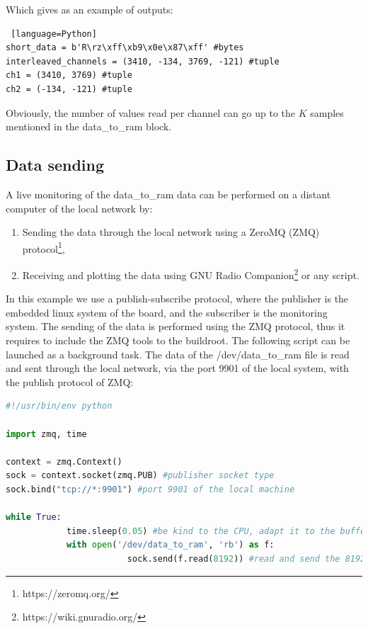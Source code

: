 \documentclass[12pt,oneside]{article}
\begin{document}
Which gives as an example of outputs:


\begin{lstlisting} [language=Python]
short_data = b'R\rz\xff\xb9\x0e\x87\xff' #bytes
interleaved_channels = (3410, -134, 3769, -121) #tuple
ch1 = (3410, 3769) #tuple
ch2 = (-134, -121) #tuple
\end{lstlisting}
\vspace{0.6cm}

Obviously, the number of values read per channel can go up to the $K$ samples mentioned in the data\_to\_ram block. 

\subsection{Data sending}\label{sect:dataSending}

A live monitoring of the data\_to\_ram data can be performed on a distant computer of the local network by:
\begin{enumerate}
	\setlength\itemsep{-0.1cm}
	\item Sending the data through the local network using a ZeroMQ (ZMQ) protocol\footnote{https://zeromq.org/},
	\item Receiving and plotting the data using GNU Radio Companion\footnote{https://wiki.gnuradio.org/} or any script.
\end{enumerate}

In this example we use a publish-subscribe protocol, where the publisher is the embedded linux system of the board, and the subscriber is the monitoring system. The sending of the data is performed using the ZMQ protocol, thus it requires to include the ZMQ tools to the buildroot. The following script can be launched as a background task. The data of the /dev/data\_to\_ram file is read and sent through the local network, via the port 9901 of the local system, with the publish protocol of ZMQ:

\vspace{-0.1cm}
\begin{lstlisting}[language=Python]
#!/usr/bin/env python

import zmq, time

context = zmq.Context()
sock = context.socket(zmq.PUB) #publisher socket type
sock.bind("tcp://*:9901") #port 9901 of the local machine

while True:
			time.sleep(0.05) #be kind to the CPU, adapt it to the buffer delay
			with open('/dev/data_to_ram', 'rb') as f:
						sock.send(f.read(8192)) #read and send the 8192 data of the data_to_ram buffer
\end{lstlisting}
\vspace{0.5cm}
\end{document}
